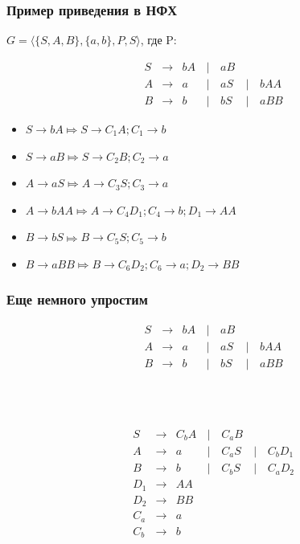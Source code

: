 \documentclass{beamer}
\begin{document}
\begin{frame}[fragile]
  \transwipe[direction=90]
  \frametitle{Пример приведения в НФХ}    
  $G = \langle \{S, A, B\}, \{a, b\}, P, S\rangle$, где P:
  
  $$
  \begin{array}{crclllll}
   & S & \rightarrow & bA &\, | \, & aB \\
   & A & \rightarrow & a &\, | \, & aS &\, | \,&  bAA  \\
   & B & \rightarrow &  b & \, | \, &  bS & \, | \, & a BB 
  \end{array}
  $$
  
  \begin{itemize}
    \item $S \rightarrow b A \Mapsto S \rightarrow C_1 A; C_1 \rightarrow b$
    \item $S \rightarrow a B \Mapsto S \rightarrow C_2 B; C_2 \rightarrow a$
    \item $A \rightarrow aS \Mapsto A \rightarrow C_3 S; C_3 \rightarrow a$
    \item $A \rightarrow b A A \Mapsto A \rightarrow C_4 D_1; C_4 \rightarrow b; D_1 \rightarrow A A$
    \item $B \rightarrow b S \Mapsto B \rightarrow C_5 S; C_5 \rightarrow b$
    \item $B \rightarrow a B B \Mapsto B \rightarrow C_6 D_2; C_6 \rightarrow a; D_2 \rightarrow B B$
  \end{itemize}
\end{frame}


\begin{frame}[fragile]
  \transwipe[direction=90]
  \frametitle{Еще немного упростим}      
  
    $$
  \begin{array}{crclllll}
   & S & \rightarrow & bA &\, | \, & aB \\
   & A & \rightarrow & a &\, | \, & aS &\, | \,&  bAA  \\
   & B & \rightarrow &  b & \, | \, &  bS & \, | \, & a BB 
  \end{array}
  $$
  
  ~\\~
  
  $$
  \begin{array}{crclllll}
   & S & \rightarrow & C_b A &\, | \, & C_a B \\
   & A & \rightarrow & a &\, | \, & C_a S &\, | \,&  C_b D_1  \\
   & B & \rightarrow &  b & \, | \, &  C_b S & \, | \, & C_a D_2 \\
   & D_1 & \rightarrow & A A & \\
   & D_2 & \rightarrow & B B & \\
   & C_a & \rightarrow & a & \\
   & C_b & \rightarrow & b & 
  \end{array}
  $$
  
\end{frame}
\end{document}
